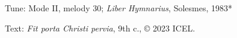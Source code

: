 


\begin{hymnsource}
Tune: Mode II, melody 30; \emph{Liber Hymnarius}, Solesmes, 1983*

Text: \emph{Fit porta Christi pervia}, 9th c., © 2023 ICEL.
\end{hymnsource}
